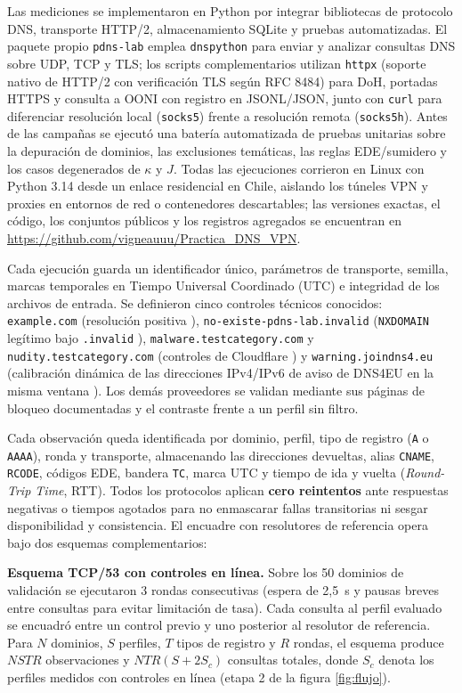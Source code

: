 \documentclass[10pt,a4paper]{article}
\begin{document}
Las mediciones se implementaron en Python por integrar bibliotecas de protocolo DNS, transporte HTTP/2, almacenamiento SQLite y pruebas automatizadas. El paquete propio \texttt{pdns-lab} emplea \texttt{dnspython} \cite{dnspython} para enviar y analizar consultas DNS sobre UDP, TCP y TLS; los scripts complementarios utilizan \texttt{httpx} (soporte nativo de HTTP/2 con verificación TLS según RFC 8484) para DoH, portadas HTTPS y consulta a OONI con registro en JSONL/JSON, junto con \texttt{curl} para diferenciar resolución local (\texttt{socks5}) frente a resolución remota (\texttt{socks5h}). Antes de las campañas se ejecutó una batería automatizada de pruebas unitarias sobre la depuración de dominios, las exclusiones temáticas, las reglas EDE/sumidero y los casos degenerados de $\kappa$ y $J$. Todas las ejecuciones corrieron en Linux con Python 3.14 desde un enlace residencial en Chile, aislando los túneles VPN y proxies en entornos de red o contenedores descartables; las versiones exactas, el código, los conjuntos públicos y los registros agregados se encuentran en \url{https://github.com/vigneauuu/Practica_DNS_VPN}.

Cada ejecución guarda un identificador único, parámetros de transporte, semilla, marcas temporales en Tiempo Universal Coordinado (UTC) e integridad de los archivos de entrada. Se definieron cinco controles técnicos conocidos: \texttt{example.com} (resolución positiva \cite{iana}), \texttt{no-existe-pdns-lab.invalid} (\texttt{NXDOMAIN} legítimo bajo \texttt{.invalid} \cite{rfc2606}), \texttt{malware.testcategory.com} y \texttt{nudity.testcategory.com} (controles de Cloudflare \cite{cloudflare}) y \texttt{warning.joindns4.eu} (calibración dinámica de las direcciones IPv4/IPv6 de aviso de DNS4EU en la misma ventana \cite{szymutko2026}). Los demás proveedores se validan mediante sus páginas de bloqueo documentadas y el contraste frente a un perfil sin filtro.

Cada observación queda identificada por dominio, perfil, tipo de registro (\texttt{A} o \texttt{AAAA}), ronda y transporte, almacenando las direcciones devueltas, alias \texttt{CNAME}, \texttt{RCODE}, códigos EDE, bandera \texttt{TC}, marca UTC y tiempo de ida y vuelta (\emph{Round-Trip Time}, RTT). Todos los protocolos aplican \textbf{cero reintentos} ante respuestas negativas o tiempos agotados para no enmascarar fallas transitorias ni sesgar disponibilidad y consistencia. El encuadre con resolutores de referencia opera bajo dos esquemas complementarios:

\textbf{Esquema TCP/53 con controles en línea.} Sobre los 50 dominios de validación se ejecutaron 3 rondas consecutivas (espera de 2,5~s y pausas breves entre consultas para evitar limitación de tasa). Cada consulta al perfil evaluado se encuadró entre un control previo y uno posterior al resolutor de referencia. Para $N$ dominios, $S$ perfiles, $T$ tipos de registro y $R$ rondas, el esquema produce $NSTR$ observaciones y $NTR(S + 2S_c)$ consultas totales, donde $S_c$ denota los perfiles medidos con controles en línea (etapa 2 de la figura \ref{fig:flujo}).
\end{document}
